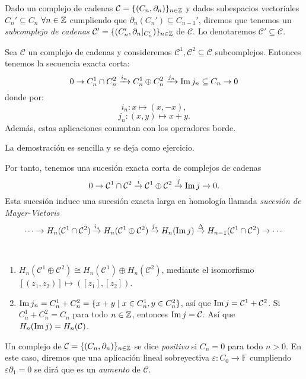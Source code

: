 \documentclass[HS.tex]{subfiles}
\begin{document}
\begin{defi}
Dado un complejo de cadenas $\mathcal{C} = \{(C_n,\partial_n)\}_{n \in \mathbb{Z}}$ y dados subespacios vectoriales $C_n' \subseteq C_n$ $\forall n \in \mathbb{Z}$ cumpliendo que $\partial_n(C_n') \subseteq C_{n-1}'$, diremos que tenemos un \emph{subcomplejo de cadenas} $\mathcal{C}' = \{(C_n',\partial_n|_{C_n'})\}_{n \in \mathbb{Z}}$ de $\mathcal{C}$. Lo denotaremos $\mathcal{C}' \subseteq \mathcal{C}$.
\end{defi}

\begin{prop}
Sea $\mathcal{C}$ un complejo de cadenas y consideremos $\mathcal{C}^1, \mathcal{C}^2 \subseteq \mathcal{C}$ subcomplejos.
Entonces tenemos la secuencia exacta corta:
\[ 0 \to C_n^1 \cap C_n^2 \xrightarrow{i_n} C_n^1 \oplus C_n^2 \xrightarrow{j_n} \operatorname{Im}{j_n}\subseteq C_n \to 0 \]
donde por:
\[ i_n \colon x \mapsto (x,-x), \]
\[ j_n \colon (x,y) \mapsto x+y.\]
Además, estas aplicaciones conmutan con los operadores borde.
\end{prop}
La demostración es sencilla y se deja como ejercicio.

Por tanto, tenemos una sucesión exacta corta de complejos de cadenas
\[
0\to\mathcal{C}^1\cap\mathcal{C}^2\overset{i}{\to}\mathcal{C}^1\oplus\mathcal{C}^2\overset{j}{\to}\operatorname{Im}{j}\to 0.
\]
Esta sucesión induce una sucesión exacta larga en homología llamada \emph{sucesión de Mayer-Vietoris}
\[
\cdots\to H_n(\mathcal{C}^1\cap\mathcal{C}^2)\overset{i_*}{\to}H_n(\mathcal{C}^1\oplus\mathcal{C}^2)\overset{j_*}{\to}H_n(\operatorname{Im}{j})\overset{\Delta}{\to}H_{n-1}(\mathcal{C}^1\cap\mathcal{C}^2)\to\cdots
\]
\newpage
\begin{observaciones}\
\begin{enumerate}
\item $H_n(\mathcal{C}^1\oplus\mathcal{C}^2)\cong H_n(\mathcal{C}^1)\oplus H_n(\mathcal{C}^2)$, mediante el isomorfismo $[(z_1,z_2)]\mapsto ([z_1],[z_2])$.
\item $\operatorname{Im}{j_n}=C^1_n+C^2_n=\{x+y\mid x\in C^1_n, y\in C^2_n\}$, así que $\operatorname{Im}{j}=\mathcal{C}^1+\mathcal{C}^2$. Si $C^1_n+C_n^2=C_n$ para todo $n\in\mathbb{Z}$, entonces $\operatorname{Im}{j}=\mathcal{C}$. Así que $H_n(\operatorname{Im}{j})=H_n(\mathcal{C})$.
\end{enumerate}
\end{observaciones}

\begin{defi}
Un complejo de $\mathcal{C}=\{(C_n,\partial_n)\}_{n\in\mathbb{Z}}$ se dice \emph{positivo} si $C_n=0$ para todo $n>0$. En este caso, diremos que una aplicación lineal sobreyectiva $\varepsilon: C_0\to\mathbb{F}$ cumpliendo $\varepsilon\partial_1=0$ se dirá que es un \emph{aumento} de $\mathcal{C}$.
\end{defi}
\end{document}
